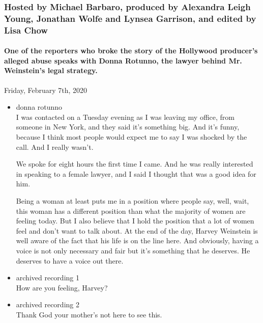 \hypertarget{hosted-by-michael-barbaro-produced-by-alexandra-leigh-young-jonathan-wolfe-and-lynsea-garrison-and-edited-by-lisa-chow-1}{%
\subsubsection{Hosted by Michael Barbaro, produced by Alexandra Leigh
Young, Jonathan Wolfe and Lynsea Garrison, and edited by Lisa
Chow}\label{hosted-by-michael-barbaro-produced-by-alexandra-leigh-young-jonathan-wolfe-and-lynsea-garrison-and-edited-by-lisa-chow-1}}

\hypertarget{one-of-the-reporters-who-broke-the-story-of-the-hollywood-producers-alleged-abuse-speaks-with-donna-rotunno-the-lawyer-behind-mr-weinsteins-legal-strategy-2}{%
\paragraph{One of the reporters who broke the story of the Hollywood
producer's alleged abuse speaks with Donna Rotunno, the lawyer behind
Mr. Weinstein's legal
strategy.}\label{one-of-the-reporters-who-broke-the-story-of-the-hollywood-producers-alleged-abuse-speaks-with-donna-rotunno-the-lawyer-behind-mr-weinsteins-legal-strategy-2}}

Friday, February 7th, 2020

\begin{itemize}
\item
  donna rotunno\\
  I was contacted on a Tuesday evening as I was leaving my office, from
  someone in New York, and they said it's something big. And it's funny,
  because I think most people would expect me to say I was shocked by
  the call. And I really wasn't.

  We spoke for eight hours the first time I came. And he was really
  interested in speaking to a female lawyer, and I said I thought that
  was a good idea for him.

  Being a woman at least puts me in a position where people say, well,
  wait, this woman has a different position than what the majority of
  women are feeling today. But I also believe that I hold the position
  that a lot of women feel and don't want to talk about. At the end of
  the day, Harvey Weinstein is well aware of the fact that his life is
  on the line here. And obviously, having a voice is not only necessary
  and fair but it's something that he deserves. He deserves to have a
  voice out there.
\item
  archived recording 1\\
  How are you feeling, Harvey?
\item
  archived recording 2\\
  Thank God your mother's not here to see this.
\end{itemize}

